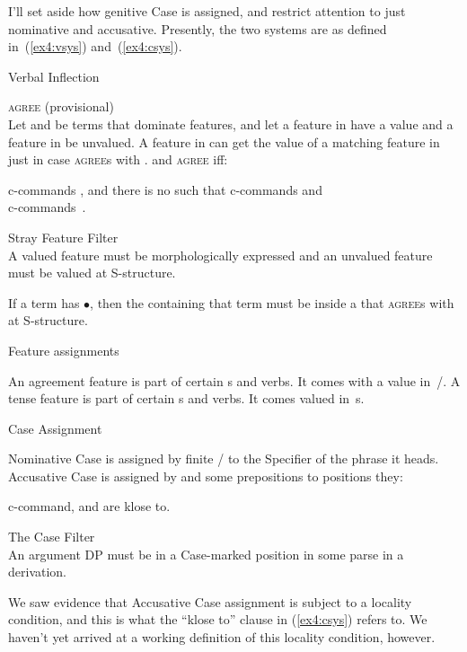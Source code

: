 I'll set aside how genitive Case is assigned, and restrict attention to just nominative and accusative. Presently, the two systems are as defined in~(\ref{ex4:vsys}) and~(\ref{ex4:csys}).
\begin{exe}
\ex \label{ex4:vsys}  Verbal Inflection
	\begin{xlist}
	\ex  \textsc{agree} (provisional)\\
	Let  and  be terms that dominate features, and let a feature in  have a value and a feature in  be unvalued. A feature in  can get the value of a matching feature in  just in case  \textsc{agree}s with .  and  \textsc{agree} iff:
\begin{xlist}
	\ex {} c-commands , and
	\ex there is no  such that  c-commands  and \\ c-commands~.
\end{xlist}

	\ex Stray Feature Filter\\
	A valued feature must be morphologically expressed and an unvalued feature must be valued at S-structure.

	\ex If a term has $\bullet$, then the  containing that term must be inside a  that  \textsc{agree}s with at S-structure.

	\ex Feature assignments
	\begin{xlist}
	\ex An agreement feature is part of certain s and verbs. It comes with a value in~/.
	\ex A tense feature is part of certain s and verbs. It comes valued in~s.
	\end{xlist}
	\pagebreak
\end{xlist}
	\ex \label{ex4:csys} Case Assignment
	\begin{xlist}
	\ex Nominative Case is assigned by finite / to the Specifier of the phrase it heads.
	\ex Accusative Case is assigned by  and some prepositions to positions they:
	\begin{xlist}
	\ex c-command, and
	\ex are klose to.
\end{xlist}

	\ex The Case Filter\\
	An argument DP must be in a Case-marked position in some parse in a derivation.
\end{xlist}
\end{exe}
We saw evidence that Accusative Case assignment is subject to a locality condition, and this is what the ``klose to'' clause in (\ref{ex4:csys}) refers to. We haven't yet arrived at a working definition of this locality condition, however.

